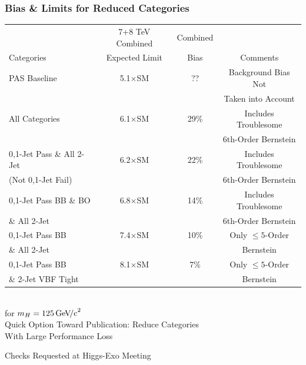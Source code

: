 \documentclass{beamer}
\newcommand{\GeVcc}{\ensuremath{\,\mathrm{Ge\kern -0.1em V\!/c}^2}}
\begin{document}
\begin{frame}
\frametitle{Bias \& Limits for Reduced Categories}
  \begin{center}
    \scriptsize
    \begin{tabular}{|l|c|c|c|} \hline
           & 7+8 TeV Combined & Combined &          \\
Categories & Expected Limit   & Bias     & Comments \\ \hline \hline
PAS Baseline & 5.1$\times$SM  & ??       & Background Bias Not         \\
                   &           &            & Taken into Account          \\ \hline
All Categories & 6.1$\times$SM  & 29\%       & Includes Troublesome         \\
                   &           &            & 6th-Order Bernstein         \\ \hline
0,1-Jet Pass \& All 2-Jet & 6.2$\times$SM  & 22\%       & Includes Troublesome         \\
(Not 0,1-Jet Fail) &           &            & 6th-Order Bernstein          \\ \hline
0,1-Jet Pass BB \& BO & 6.8$\times$SM  & 14\%       & Includes Troublesome         \\
\& All 2-Jet &           &            & 6th-Order Bernstein          \\ \hline
0,1-Jet Pass BB & 7.4$\times$SM  & 10\%       & Only $\leq5$-Order         \\
\& All 2-Jet &           &            &        Bernstein  \\ \hline
0,1-Jet Pass BB & 8.1$\times$SM  & 7\%       & Only $\leq5$-Order         \\
\& 2-Jet VBF Tight &           &            & Bernstein         \\ \hline
    \end{tabular}
    \\ for $m_H=125\GeVcc{}$
  \normalsize
  \\ \vspace{1ex}
  Quick Option Toward Publication: Reduce Categories
  \\ With Large Performance Loss
  \end{center}
\end{frame}

\begin{frame}
  \begin{center}
    \Huge
    Checks Requested at Higgs-Exo Meeting
  \end{center}
\end{frame}
\end{document}
